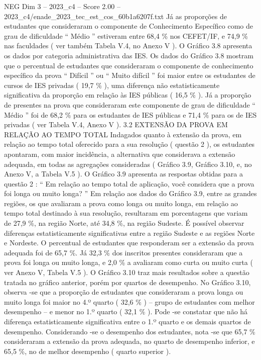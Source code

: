 \begin{textsample}{NEG Dim 3 – 2023\_c4 – Score 2.00 – 2023\_c4/enade\_2023\_tec\_est\_cos\_60b1a6207f.txt}
Já as proporções de estudantes que consideraram o componente de Conhecimento Específico como de grau de dificuldade “ Médio ” estiveram entre 68,4 \% nos CEFET/IF, e 74,9 \% nas faculdades ( ver também Tabela V.4, no Anexo V ).
O Gráfico 3.8 apresenta os dados por categoria administrativa das IES.
Os dados do Gráfico 3.8 mostram que o percentual de estudantes que consideraram o componente de conhecimento específico da prova “ Difícil ” ou “ Muito difícil ” foi maior entre os estudantes de cursos de IES privadas ( 19,7 \% ), uma diferença não estatisticamente significativa da proporção em relação às IES públicas ( 16,5 \% ).
Já a proporção de presentes na prova que consideraram este componente de grau de dificuldade “ Médio ” foi de 68,2 \% para os estudantes de IES públicas e 71,4 \% para os de IES privadas ( ver Tabela V.4, Anexo V ). 3.2 EXTENSÃO DA PROVA EM RELAÇÃO AO TEMPO TOTAL Indagados quanto à extensão da prova, em relação ao tempo total oferecido para a sua resolução ( questão 2 ), os estudantes apontaram, com maior incidência, a alternativa que considerava a extensão adequada, em todas as agregações consideradas ( Gráfico 3.9, Gráfico 3.10, e, no Anexo V, a Tabela V.5 ).
O Gráfico 3.9 apresenta as respostas obtidas para a questão 2 : “ Em relação ao tempo total de aplicação, você considera que a prova foi longa ou muito longa? ” Em relação aos dados do Gráfico 3.9, entre as grandes regiões, os que avaliaram a prova como longa ou muito longa, em relação ao tempo total destinado à sua resolução, resultaram em porcentagens que variam de 27,9 \%, na região Norte, até 34,8 \%, na região Sudeste.
É possível observar diferenças estatisticamente significativas entre a região Sudeste e as regiões Norte e Nordeste.
O percentual de estudantes que responderam ser a extensão da prova adequada foi de 65,7 \%.
Já 32,3 \% dos inscritos presentes consideraram que a prova foi longa ou muito longa, e 2,0 \% a avaliaram como curta ou muito curta ( ver Anexo V, Tabela V.5 ).
O Gráfico 3.10 traz mais resultados sobre a questão tratada no gráfico anterior, porém por quartos de desempenho.
No Gráfico 3.10, observa -se que a proporção de estudantes que consideraram a prova longa ou muito longa foi maior no 4.º quarto ( 32,6 \% ) – grupo de estudantes com melhor desempenho – e menor no 1.º quarto ( 32,1 \% ).
Pode -se constatar que não há diferença estatisticamente significativa entre o 1.º quarto e os demais quartos de desempenho.
Considerando -se o desempenho dos estudantes, nota -se que 65,7 \% consideraram a extensão da prova adequada, no quarto de desempenho inferior, e 65,5 \%, no de melhor desempenho ( quarto superior ).

\end{textsample}
